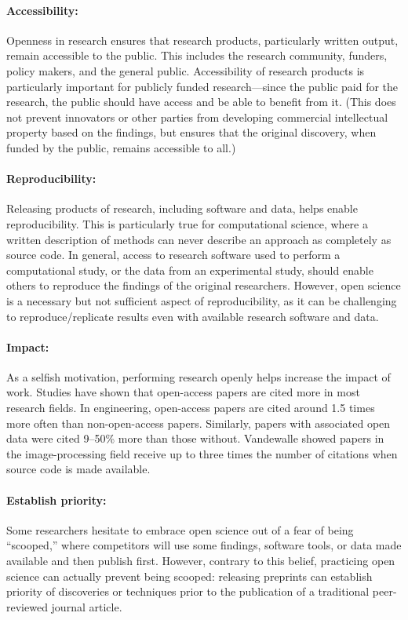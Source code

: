 \documentclass[nobib]{tufte-handout}
\begin{document}
\paragraph{Accessibility:}
Openness in research ensures that research products,
particularly written output, remain accessible to the public. This includes the
research community, funders, policy makers, and the general public. Accessibility
of research products is particularly important for publicly funded
research---since the public paid for the research, the public should have access
and be able to benefit from it.
(This does not prevent innovators or other parties from developing commercial
intellectual property based on the findings, but ensures that the original
discovery, when funded by the public, remains accessible to all.)

\paragraph{Reproducibility:}
Releasing products of research, including software and data, helps enable
reproducibility. This is particularly true for computational science, where a
written description of methods can never describe an approach as completely as
source code. In general, access to research software used to perform a
computational study, or the data from an experimental study, should enable
others to reproduce the findings of the original researchers.
However, open science is a necessary but not sufficient aspect of reproducibility,
as it can be challenging to reproduce\slash replicate results even with
available research software and data\autocite{Mesnard:2016,Barba:2016ky}.

\paragraph{Impact:}
As a selfish motivation, performing research openly helps increase the impact of work.
Studies have shown that open-access papers are cited more in most research fields.
In engineering, open-access papers are cited around 1.5 times more often than
non-open-access papers. Similarly, papers with associated
open data were cited 9--50\% more than those
without\autocite{Piwowar:2013cc,McKiernan:2016iz}.
Vandewalle\autocite{Vandewalle:2012cl} showed papers in the image-processing
field receive up to three times the number of citations when source code is
made available.

\paragraph{Establish priority:}
Some researchers hesitate to embrace open science out of a fear of being ``scooped,''
where competitors will use some findings, software tools, or data made available
and then publish first. However, contrary to this belief, practicing open science
can actually prevent being scooped: releasing preprints can establish priority of
discoveries or techniques prior to the publication of a traditional peer-reviewed
journal article\autocite{Berg:2016gl,Strasser:2016fr}.
\end{document}
